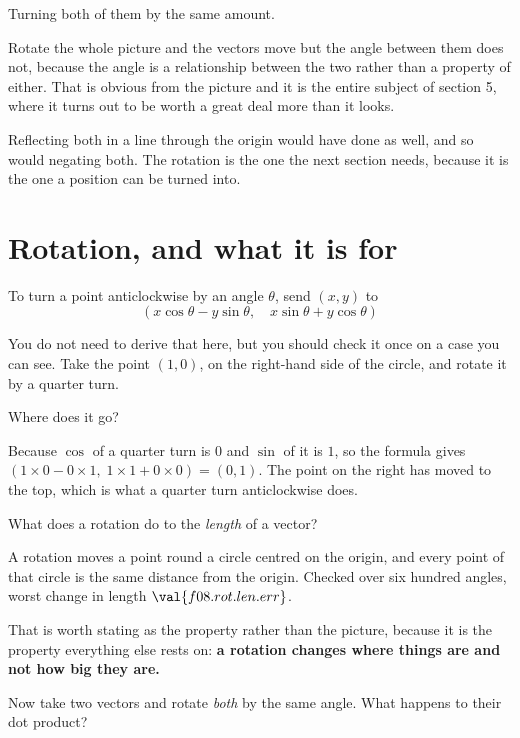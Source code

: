 \begin{fr}
\begin{ansblock}
Turning both of them by the same amount.
\end{ansblock}

Rotate the whole picture and the vectors move but the angle between them does
not, because the angle is a relationship between the two rather than a
property of either. That is obvious from the picture and it is the entire
subject of section 5, where it turns out to be worth a great deal more than it
looks.

Reflecting both in a line through the origin would have done as well, and so
would negating both. The rotation is the one the next section needs, because
it is the one a position can be turned into.
\end{fr}

\section{Rotation, and what it is for}
\label{sec:F08-rotation}

\begin{fr}
To turn a point anticlockwise by an angle $\theta$, send $(x, y)$ to
\[ (x\cos\theta - y\sin\theta,\quad x\sin\theta + y\cos\theta) \]

You do not need to derive that here, but you should check it once on a case you
can see. Take the point $(1, 0)$, on the right-hand side of the circle, and
rotate it by a quarter turn.

Where does it go?
\nextframe
\end{fr}

\begin{fr}
Because $\cos$ of a quarter turn is $0$ and $\sin$ of it is $1$, so the formula
gives $(1 \times 0 - 0 \times 1,\; 1 \times 1 + 0 \times 0) = (0, 1)$. The
point on the right has moved to the top, which is what a quarter turn
anticlockwise does.

What does a rotation do to the \emph{length} of a vector?
\nextframe
\end{fr}

\begin{fr}
A rotation moves a point round a circle centred on the origin, and every point
of that circle is the same distance from the origin. Checked over six hundred
angles, worst change in length $\val{f08.rot.len.err}$.

That is worth stating as the property rather than the picture, because it is
the property everything else rests on: \textbf{a rotation changes where things
are and not how big they are.}

Now take two vectors and rotate \emph{both} by the same angle. What happens to
their dot product?
\nextframe
\end{fr}

